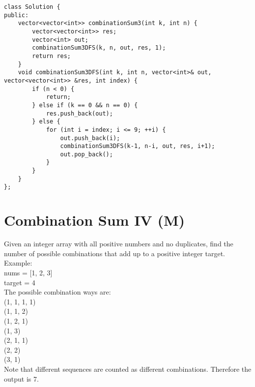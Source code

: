 \begin{lstlisting}
class Solution {
public:
    vector<vector<int>> combinationSum3(int k, int n) {
        vector<vector<int>> res;
        vector<int> out;
        combinationSum3DFS(k, n, out, res, 1);
        return res;
    }
    void combinationSum3DFS(int k, int n, vector<int>& out, vector<vector<int>> &res, int index) {
        if (n < 0) {
            return;
        } else if (k == 0 && n == 0) {
            res.push_back(out);
        } else {
            for (int i = index; i <= 9; ++i) {
                out.push_back(i);
                combinationSum3DFS(k-1, n-i, out, res, i+1);
                out.pop_back();
            }
        }
    }
};
\end{lstlisting}

\section{Combination Sum IV (M)}
Given an integer array with all positive numbers and no duplicates, find the number of possible combinations that add up to a positive integer target. \\

Example:\\
nums = [1, 2, 3]\\
target = 4\\

The possible combination ways are:\\
(1, 1, 1, 1)\\
(1, 1, 2)\\
(1, 2, 1)\\
(1, 3)\\
(2, 1, 1)\\
(2, 2)\\
(3, 1)\\

Note that different sequences are counted as different combinations. Therefore the output is 7.\\

